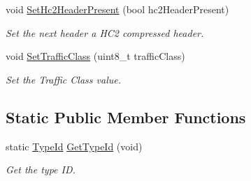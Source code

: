 \begin{DoxyCompactItemize}
void \hyperlink{classns3_1_1SixLowPanHc1_a4804125c82273c99a58c18347ade5f41}{Set\+Hc2\+Header\+Present} (bool hc2\+Header\+Present)
\begin{DoxyCompactList}\small\item\em Set the next header a H\+C2 compressed header. \end{DoxyCompactList}\item 
void \hyperlink{classns3_1_1SixLowPanHc1_a1aa11c4f77fd0155aa4c87bce21a5804}{Set\+Traffic\+Class} (uint8\+\_\+t traffic\+Class)
\begin{DoxyCompactList}\small\item\em Set the Traffic Class value. \end{DoxyCompactList}\end{DoxyCompactItemize}
\subsection*{Static Public Member Functions}
\begin{DoxyCompactItemize}
\item 
static \hyperlink{classns3_1_1TypeId}{Type\+Id} \hyperlink{classns3_1_1SixLowPanHc1_ae5e74636ac964a0c76ce2a8f8d028e7f}{Get\+Type\+Id} (void)
\begin{DoxyCompactList}\small\item\em Get the type ID. \end{DoxyCompactList}\end{DoxyCompactItemize}
